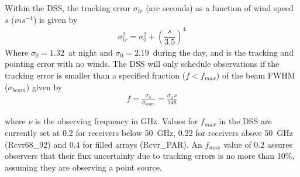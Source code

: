 Within the \gls{DSS}, the tracking error $\sigma_{tr}$  (arc seconds) as a function of
wind speed $s$ ($m s^{-1}$) is given by 
\begin{align}
\sigma_{tr}^2 = \sigma_0^2 + \left(\dfrac{s}{3.5}\right)^4
\label{eq:wind}
\end{align}
Where $\sigma_0=1.32$\arcsecond\ at night and $\sigma_0=2.19$\arcsecond\ during
the day, and is the tracking and pointing error with no winds. The \gls{DSS} will
only schedule observations if the tracking error is smaller than a specified fraction
($f<f_{max}$) of the beam \gls{FWHM} ($\sigma_{beam}$) given by
\begin{align}
f = \frac{\sigma_{tr}}{\sigma_{beam}} = \frac{\sigma_{tr}\nu}{748}
\label{eq:dss_wind_limit}
\end{align}

where $\nu$ is the observing frequency in GHz.  Values for $f_{max}$ in the \gls{DSS}
are currently set at 0.2 for receivers below 50~GHz, 0.22 for receivers above 50~GHz
(Rcvr68\_92) and 0.4 for filled arrays (Rcvr\_PAR).  An $f_{max}$ value of 0.2 assures
observers that their flux uncertainty due to tracking errors is no more than 10\%,
assuming they are observing a point source.

